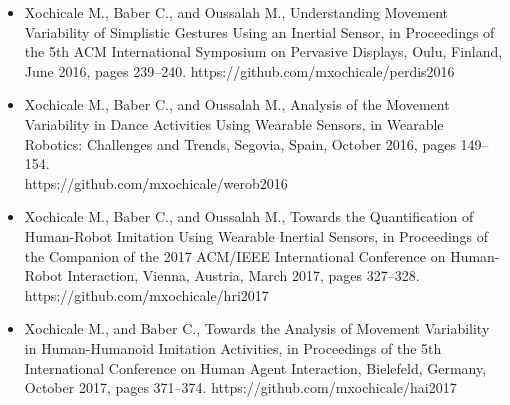 \begin{itemize}
\item Xochicale M., Baber C., and Oussalah M.,
	Understanding Movement Variability of Simplistic Gestures Using 
	an Inertial Sensor, in Proceedings of the 5th ACM International 
	Symposium on Pervasive Displays, 
	Oulu, Finland, June 2016, 
	pages 239--240.
	https://github.com/mxochicale/perdis2016

\item Xochicale M., Baber C., and Oussalah M.,
	Analysis of the Movement Variability in Dance Activities Using 
	Wearable Sensors,
	in Wearable Robotics: Challenges and Trends,
	Segovia, Spain, October 2016,
	pages 149--154. \\
	https://github.com/mxochicale/werob2016

\item Xochicale M., Baber C., and Oussalah M.,
	Towards the Quantification of Human-Robot Imitation Using Wearable 
	Inertial Sensors, in Proceedings of the Companion of the 2017 
	ACM/IEEE International Conference on Human-Robot Interaction,
	Vienna, Austria, March 2017,
	pages 327--328. \\
	https://github.com/mxochicale/hri2017

\item Xochicale M., and Baber C.,
	Towards the Analysis of Movement Variability in Human-Humanoid 
	Imitation Activities, in Proceedings of the 5th International 
	Conference on Human Agent Interaction,
	Bielefeld, Germany, October 2017,
	pages 371--374.
	https://github.com/mxochicale/hai2017

\end{itemize}


